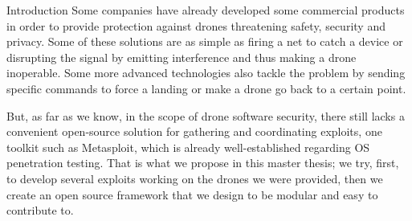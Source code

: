 \begin{chaptercover}{Introduction}
Some companies have already developed some commercial products in order to provide protection against drones threatening safety, security and privacy. Some of these solutions are as simple as firing a net to catch a device or disrupting the signal by emitting interference and thus making a drone inoperable. Some more advanced technologies also tackle the problem by sending specific commands to force a landing or make a drone go back to a certain point.

But, as far as we know, in the scope of drone software security, there still lacks a convenient open-source solution for gathering and coordinating exploits, one toolkit such as Metasploit, which is already well-established regarding OS penetration testing. That is what we propose in this master thesis; we try, first, to develop several exploits working on the drones we were provided, then we create an open source framework that we design to be modular and easy to contribute to.



\end{chaptercover}
